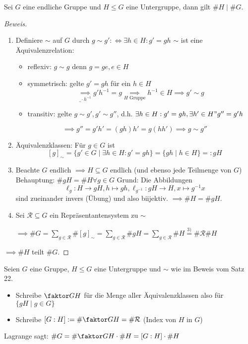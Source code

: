 \documentclass[a4paper]{report}
\begin{document}
\begin{satz}
Sei $G$ eine endliche Gruppe und $H \le G$ eine Untergruppe, dann gilt $\#H \mid \#G$.
\end{satz}
\begin{proof}[Beweis] \item
  \begin{enumerate} [1)]
    \item Definiere $\sim$ auf $G$ durch $g \sim g' :\iff \exists h \in H : g' = gh$
          $\sim$ ist eine Äquivalenzrelation:
          \begin{itemize}
            \item reflexiv: $g \sim g$ denn $g = ge, e \in H$
            \item symmetrisch: gelte $g' = gh$ für ein $h \in H$ $$\underset{\_\cdot h^{-1}}{\implies} g'h^{-1}=g \underset{H \text{ Gruppe}} \implies h^{-1} \in H \implies g' \sim g$$
            \item transitiv: gelte $g \sim g', g' \sim g''$, d.h. $\exists h \in H : g' = gh, \exists h' \in H " g'' = g'h$
          \end{itemize}
            $$\implies g'' = g'h' = (gh)h' = g(hh') \implies g \sim g''$$
    \item Äquivalenzklassen: Für $g \in G$ ist
    $$[g]_{\sim} = \{g' \in G \mid \exists h \in H : g' = gh\} = \{gh \mid h \in H\} =: gH$$
    \item Beachte $G$ endlich $\implies H \subseteq G$ endlich (und ebenso jede Teilmenge von $G$)
        Behauptung: $\#gH = \#H \forall g \in G$
        Grund: Die Abbildungen $$\ell_{g}: H \to gH, h \mapsto gh, \ell_{g^{-1}}: gH \to H, x \mapsto g^{-1}x$$ sind zueinander invers (Übung) und also biijektiv. $\implies \#H = \#gH$.
    \item Sei $\mathcal R \subseteq G$ ein Repräsentantensystem zu $\sim$

          $\implies \#G = \sum_{g \in \mathcal R} \# [g]_{\sim} = \sum_{g \in \mathcal R} \#gH = \sum_{g \in \mathcal R} \#H \overset{3)}= \# \mathcal R \# H$
  \end{enumerate}
$\implies \#H$ teilt $\#G$.
\end{proof}

\begin{nota*}
Seien $G$ eine Gruppe, $H \le G$ eine Untergruppe und $\sim$ wie im Beweis vom Satz 22.
\begin{itemize}
\item Schreibe $\faktor GH$ für die Menge aller Äquivalenzklassen also für $\{gH \mid g \in G\}$
\item Schreibe $[G : H]:= \#  \faktor GH = \# \mathcal R$ (Index von $H$ in $G$)
\end{itemize}
Lagrange sagt: $\#G = \# \faktor GH \cdot \#H = [G : H] \cdot \#H$
\end{nota*}
\end{document}
